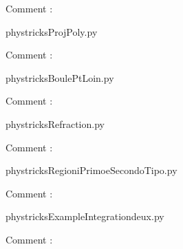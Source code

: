     Comment : 

    \clearpage
    


    \newcommand{\CaptionFigProjPoly}{<+Type your caption here+>}
    \begin{center}
        
    \end{center}
    phystricksProjPoly.py

    Comment : 

    \clearpage
    


    \newcommand{\CaptionFigBoulePtLoin}{<+Type your caption here+>}
    \begin{center}
        
    \end{center}
    phystricksBoulePtLoin.py

    Comment : 

    \clearpage
    


    \newcommand{\CaptionFigRefraction}{<+Type your caption here+>}
    \begin{center}
        
    \end{center}
    phystricksRefraction.py

    Comment : 

    \clearpage
    


    \newcommand{\CaptionFigRegioniPrimoeSecondoTipo}{<+Type your caption here+>}
    \begin{center}
        
    \end{center}
    phystricksRegioniPrimoeSecondoTipo.py

    Comment : 

    \clearpage
    


    \newcommand{\CaptionFigExampleIntegrationdeux}{<+Type your caption here+>}
    \begin{center}
        
    \end{center}
    phystricksExampleIntegrationdeux.py

    Comment : 

